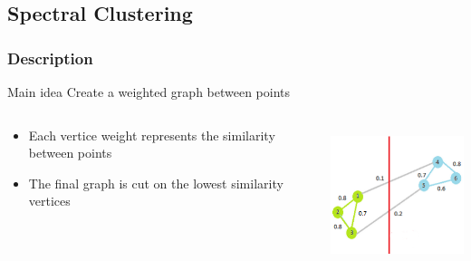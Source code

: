 \documentclass[10p]{beamer}
\begin{document}
\subsection{Spectral Clustering}
\begin{frame}
\frametitle{Description}
\begin{block}{Main idea}
Create a weighted graph between points
\end{block}
\vfill
\begin{columns}
\begin{column}{0.6\textwidth}
\begin{itemize}
\item Each vertice weight represents the similarity between points
\item The final graph is cut on the lowest similarity vertices
\end{itemize}
\end{column}
\begin{column}{0.4\textwidth}
\includegraphics[width=\columnwidth, height=4cm]{Image/graph.png}
\end{column}
\end{columns}
\end{frame}
\end{document}
